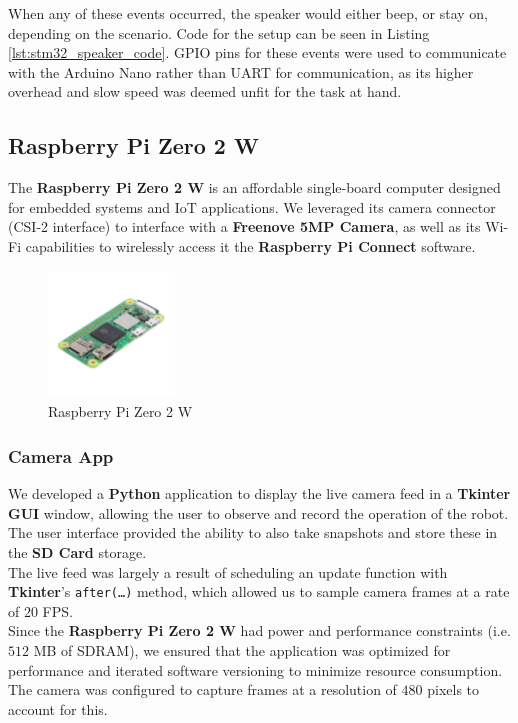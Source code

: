 \documentclass{article}
\begin{document}
When any of these events occurred, the speaker would either beep, or stay on, depending on the scenario. Code for the setup can be seen in Listing \ref{lst:stm32_speaker_code}. GPIO pins for these events were used to communicate with the Arduino Nano rather than UART for communication, as its higher overhead
and slow speed was deemed unfit for the task at hand.

\subsection{Raspberry Pi Zero 2 W}

The \textbf{Raspberry Pi Zero 2 W} is an affordable single-board computer designed for
embedded systems and IoT applications. We leveraged its camera connector (CSI-2 interface)
to interface with a \textbf{Freenove 5MP Camera}, as well as its Wi-Fi capabilities to
wirelessly access it the \textbf{Raspberry Pi Connect} software.

\begin{figure}[H]
    \centering
    \includegraphics[width=0.3\textwidth]{Figures/PiZero_2.jpg}
    \caption{Raspberry Pi Zero 2 W}
    \label{fig:raspberrypi}
\end{figure}

\subsubsection{Camera App}

\begin{minipage}{\linewidth}
    We developed a \textbf{Python} application to display the live camera feed in a \textbf{Tkinter GUI} window,
    allowing the user to observe and record the operation of the robot. The user interface provided the ability to also
    take snapshots and store these in the \textbf{SD Card} storage. \\

    The live feed was largely a result of scheduling an update function with \textbf{Tkinter}'s \texttt{after(\dots)} method,
    which allowed us to sample camera frames at a rate of $20$ FPS. \\

    Since the \textbf{Raspberry Pi Zero 2 W} had power and performance constraints (i.e. $512$ MB of SDRAM),
    we ensured that the application was optimized for performance and iterated software versioning
    to minimize resource consumption. The camera was configured to capture frames at a resolution of $480$ pixels to account for this. \\
\end{minipage}
\end{document}
